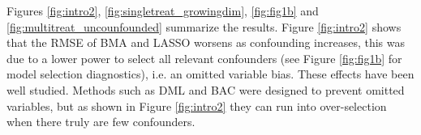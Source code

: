 \documentclass[12pt]{article}
\def\cred{\textcolor{red}}
\newcommand{\norm}[1]{\lVert#1\rVert}
\newcommand{\bgamma}{{\bm{\gamma}}}
\begin{document}
Figures \ref{fig:intro2}, \ref{fig:singletreat_growingdim}, \ref{fig:fig1b} and \ref{fig:multitreat_uncounfounded} summarize the results.
Figure \ref{fig:intro2} shows that the RMSE of BMA and LASSO worsens as confounding increases, this was due to a lower power to select all relevant confounders (see Figure \ref{fig:fig1b} for model selection diagnostics), i.e. an omitted variable bias. 
These effects have been well studied. %
Methods such as DML and BAC were designed to prevent omitted variables, but as shown in Figure \ref{fig:intro2} they can run into over-selection when there truly are few confounders.
\end{document}
